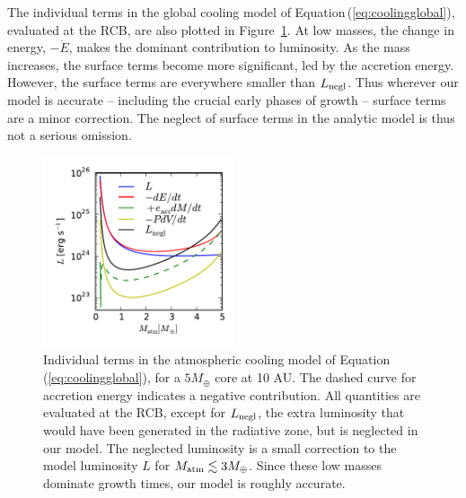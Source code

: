 \documentclass[apj, numberedappendix]{emulateapj}
\newcommand{\Eq}[1]{Equation\,(\ref{#1})}
\newcommand{\Fig}[1]{Figure~\ref{#1}}
\begin{document}
The individual terms in the global cooling model of \Eq{eq:coolingglobal}, evaluated at the RCB, are also plotted in \Fig{fig:coolingterms}.  At low masses, the change in energy, $- \dot{E}$, makes the dominant contribution to luminosity.  As the mass increases, the surface terms become more significant, led by the accretion energy.  However, the surface terms are everywhere smaller than $L_{\rm negl}$.  Thus wherever our model is accurate -- including the crucial early phases of growth -- surface terms are a minor correction.  The neglect of surface terms in the analytic model is thus not a serious omission.


 
\begin{figure}[tb]
\centering
\includegraphics[width=0.5\textwidth]{../../figs/ModelAtmospheres/RadSelfGravPoly/PaperFigs/cooling_a10_Mc5_rcb.pdf}
\caption{Individual terms in the atmospheric cooling model of \Eq{eq:coolingglobal}, for a $5 M_\oplus$ core at 10 AU.  The dashed curve for accretion energy indicates a negative contribution.  All quantities are evaluated at the RCB, except for $L_{\rm negl}$, the extra luminosity that would have been generated in the radiative zone, but is neglected in our model. The neglected luminosity is a small correction to the model luminosity $L$ for $M_{\rm atm} \lesssim 3 M_{\oplus}$.   Since these low masses dominate growth times, our model is roughly accurate.}
\label{fig:coolingterms}
\end{figure}
\end{document}
